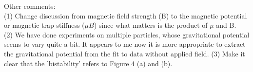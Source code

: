 \documentclass[aps,prl, twocolumn,groupedaddress]{revtex4}
\begin{document}
Other comments:\\
(1) Change discussion from magnetic field strength (B) to the magnetic potential or magnetic trap stiffness ($\mu B$) since what matters is the product of $\mu$ and B. \\
(2) We have done experiments on multiple particles, whose gravitational potential seems to vary quite a bit. It appears to me now it is more appropriate to extract the gravitational potential from the fit to data without applied field.  
(3) Make it clear that the 'bistability' refers to Figure 4 (a) and (b). 
\end{document}
